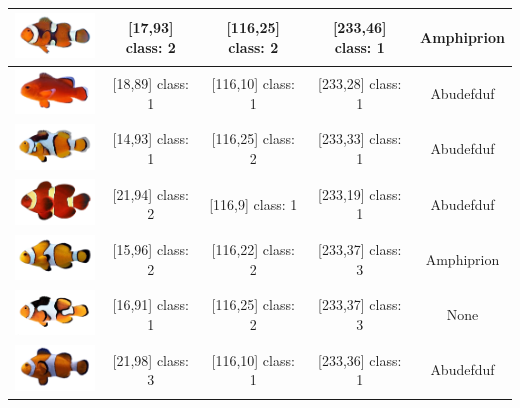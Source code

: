 \begin{longtable}{|c|c|c|c|c|}
	\includegraphics[width=3cm]{gambar/dataset_validasi/Amphiprion13} & [17,93] class: 2 & [116,25] class: 2 & [233,46] class: 1 & Amphiprion \\ \hline
	\includegraphics[width=3cm]{gambar/dataset_validasi/Amphiprion14} & [18,89] class: 1 & [116,10] class: 1 & [233,28] class: 1 & Abudefduf \\ \hline
	\includegraphics[width=3cm]{gambar/dataset_validasi/Amphiprion15} & [14,93] class: 1 & [116,25] class: 2 & [233,33] class: 1 & Abudefduf \\ \hline
	\includegraphics[width=3cm]{gambar/dataset_validasi/Amphiprion16} & [21,94] class: 2 & [116,9] class: 1 & [233,19] class: 1 & Abudefduf \\ \hline
	\includegraphics[width=3cm]{gambar/dataset_validasi/Amphiprion17} & [15,96] class: 2 & [116,22] class: 2 & [233,37] class: 3 & Amphiprion \\ \hline
	\includegraphics[width=3cm]{gambar/dataset_validasi/Amphiprion18} & [16,91] class: 1 & [116,25] class: 2 & [233,37] class: 3 & None \\ \hline
	\includegraphics[width=3cm]{gambar/dataset_validasi/Amphiprion19} & [21,98] class: 3 & [116,10] class: 1 & [233,36] class: 1 & Abudefduf \\ \hline

\end{longtable}
